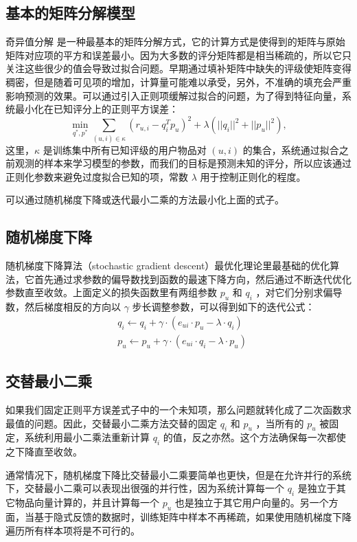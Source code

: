\subsection{基本的矩阵分解模型}
奇异值分解 \cite{paterek2007improving} 是一种最基本的矩阵分解方式，它的计算方式是使得到的矩阵与原始矩阵对应项的平方和误差最小。因为大多数的评分矩阵都是相当稀疏的，所以它只关注这些很少的值会导致过拟合问题。早期通过填补矩阵中缺失的评级使矩阵变得稠密，但是随着可见项的增加，计算量可能难以承受，另外，不准确的填充会严重影响预测的效果。可以通过引入正则项缓解过拟合的问题，为了得到特征向量，系统最小化在已知评分上的正则平方误差：
\begin{equation}
\min_{q^*, p^*} {\sum\limits_{(u,i) \in \kappa} {{(r_{u,i}-q_i^Tp_u)}^2 + \lambda(||q_i||^2 + ||p_u||^2)} } ,
\end{equation}
这里，$\kappa$ 是训练集中所有已知评级的用户物品对 $(u,i)$ 的集合，系统通过拟合之前观测的样本来学习模型的参数，而我们的目标是预测未知的评分，所以应该通过正则化参数来避免过度拟合已知的项，常数 $\lambda$ 用于控制正则化的程度。

可以通过随机梯度下降或迭代最小二乘的方法最小化上面的式子。


\subsection{随机梯度下降}
随机梯度下降算法（stochastic gradient descent）最优化理论里最基础的优化算法，它首先通过求参数的偏导数找到函数的最速下降方向，然后通过不断迭代优化参数直至收敛。上面定义的损失函数里有两组参数 $p_{u}$ 和 $q_{i}$ ，对它们分别求偏导数，然后梯度相反的方向以  $𝛾$ 步长调整参数，可以得到如下的迭代公式：
\begin{equation}
\begin{aligned}
&q_i \leftarrow q_i + 𝛾 \cdot(e_{ui} \cdot p_u -\lambda \cdot q_i)\\
&p_u \leftarrow p_u + 𝛾 \cdot(e_{ui} \cdot q_i- \lambda \cdot p_u)
\end{aligned}
\end{equation}

\subsection{交替最小二乘}
如果我们固定正则平方误差式子中的一个未知项，那么问题就转化成了二次函数求最值的问题。因此，交替最小二乘方法交替的固定 $q_i$ 和 $p_u$ ，当所有的 $p_u$ 被固定，系统利用最小二乘法重新计算 $q_i$ 的值，反之亦然。这个方法确保每一次都使之下降直至收敛。

通常情况下，随机梯度下降比交替最小二乘要简单也更快，但是在允许并行的系统下，交替最小二乘可以表现出很强的并行性，因为系统计算每一个 $q_i$ 是独立于其它物品向量计算的，并且计算每一个 $p_u$ 也是独立于其它用户向量的。另一个方面，当基于隐式反馈的数据时，训练矩阵中样本不再稀疏，如果使用随机梯度下降遍历所有样本项将是不可行的。


